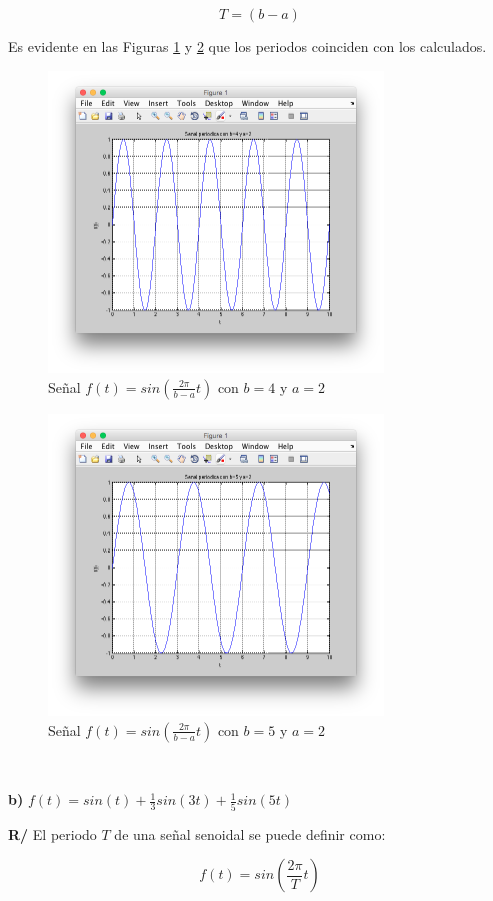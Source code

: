 \documentclass[twocolumn]{article}
\begin{document}
$$T = (b - a)$$

Es evidente en las Figuras \ref{fig_ba4_2} y \ref{fig_ba5_2} que los periodos coinciden con los calculados.

\begin{figure}[!t]
\centering
\includegraphics[width=3.5in]{imgs/ba4_2.png}
\caption{Señal $f(t) = sin(\frac{2\pi}{b-a}t)$ con $b=4$ y $a=2$}
\label{fig_ba4_2}
\end{figure}

\begin{figure}[!t]
\centering
\includegraphics[width=3.5in]{imgs/ba5_2.png}
\caption{Señal $f(t) = sin(\frac{2\pi}{b-a}t)$ con $b=5$ y $a=2$}
\label{fig_ba5_2}
\end{figure}

$\,$

\textbf{b)} $f(t) = sin(t) + \frac{1}{3}sin(3t) + \frac{1}{5}sin(5t)$

\textbf{R/} El periodo $T$ de una señal senoidal se puede definir como:

$$f(t) = sin\left(\frac{2\pi}{T}t\right)$$
\end{document}
